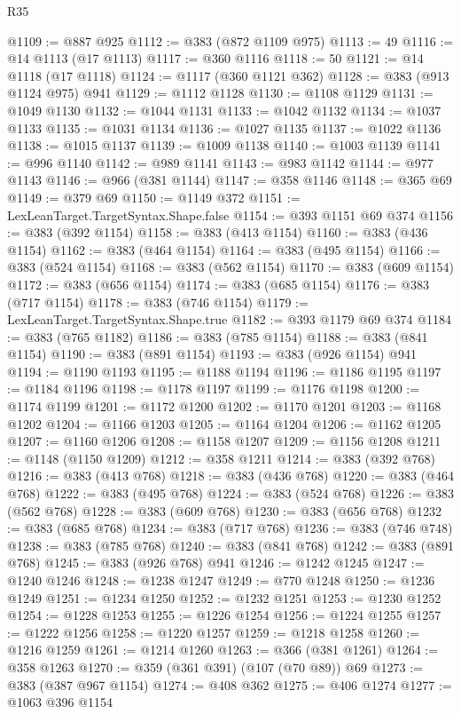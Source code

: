 \begin{lexlean}{R35}
\begin{coremodule}
@1109 := @887 @925
@1112 := @383 (@872 @1109 @975)
@1113 := 49
@1116 := @14 @1113 (@17 @1113)
@1117 := @360 @1116
@1118 := 50
@1121 := @14 @1118 (@17 @1118)
@1124 := @1117 (@360 @1121 @362)
@1128 := @383 (@913 @1124 @975) @941
@1129 := @1112 @1128
@1130 := @1108 @1129
@1131 := @1049 @1130
@1132 := @1044 @1131
@1133 := @1042 @1132
@1134 := @1037 @1133
@1135 := @1031 @1134
@1136 := @1027 @1135
@1137 := @1022 @1136
@1138 := @1015 @1137
@1139 := @1009 @1138
@1140 := @1003 @1139
@1141 := @996 @1140
@1142 := @989 @1141
@1143 := @983 @1142
@1144 := @977 @1143
@1146 := @966 (@381 @1144)
@1147 := @358 @1146
@1148 := @365 @69
@1149 := @379 @69
@1150 := @1149 @372
@1151 := LexLeanTarget.TargetSyntax.Shape.false
@1154 := @393 @1151 @69 @374
@1156 := @383 (@392 @1154)
@1158 := @383 (@413 @1154)
@1160 := @383 (@436 @1154)
@1162 := @383 (@464 @1154)
@1164 := @383 (@495 @1154)
@1166 := @383 (@524 @1154)
@1168 := @383 (@562 @1154)
@1170 := @383 (@609 @1154)
@1172 := @383 (@656 @1154)
@1174 := @383 (@685 @1154)
@1176 := @383 (@717 @1154)
@1178 := @383 (@746 @1154)
@1179 := LexLeanTarget.TargetSyntax.Shape.true
@1182 := @393 @1179 @69 @374
@1184 := @383 (@765 @1182)
@1186 := @383 (@785 @1154)
@1188 := @383 (@841 @1154)
@1190 := @383 (@891 @1154)
@1193 := @383 (@926 @1154) @941
@1194 := @1190 @1193
@1195 := @1188 @1194
@1196 := @1186 @1195
@1197 := @1184 @1196
@1198 := @1178 @1197
@1199 := @1176 @1198
@1200 := @1174 @1199
@1201 := @1172 @1200
@1202 := @1170 @1201
@1203 := @1168 @1202
@1204 := @1166 @1203
@1205 := @1164 @1204
@1206 := @1162 @1205
@1207 := @1160 @1206
@1208 := @1158 @1207
@1209 := @1156 @1208
@1211 := @1148 (@1150 @1209)
@1212 := @358 @1211
@1214 := @383 (@392 @768)
@1216 := @383 (@413 @768)
@1218 := @383 (@436 @768)
@1220 := @383 (@464 @768)
@1222 := @383 (@495 @768)
@1224 := @383 (@524 @768)
@1226 := @383 (@562 @768)
@1228 := @383 (@609 @768)
@1230 := @383 (@656 @768)
@1232 := @383 (@685 @768)
@1234 := @383 (@717 @768)
@1236 := @383 (@746 @748)
@1238 := @383 (@785 @768)
@1240 := @383 (@841 @768)
@1242 := @383 (@891 @768)
@1245 := @383 (@926 @768) @941
@1246 := @1242 @1245
@1247 := @1240 @1246
@1248 := @1238 @1247
@1249 := @770 @1248
@1250 := @1236 @1249
@1251 := @1234 @1250
@1252 := @1232 @1251
@1253 := @1230 @1252
@1254 := @1228 @1253
@1255 := @1226 @1254
@1256 := @1224 @1255
@1257 := @1222 @1256
@1258 := @1220 @1257
@1259 := @1218 @1258
@1260 := @1216 @1259
@1261 := @1214 @1260
@1263 := @366 (@381 @1261)
@1264 := @358 @1263
@1270 := @359 (@361 @391) (@107 (@70 @89)) @69
@1273 := @383 (@387 @967 @1154)
@1274 := @408 @362
@1275 := @406 @1274
@1277 := @1063 @396 @1154

\end{coremodule}
\end{lexlean}
